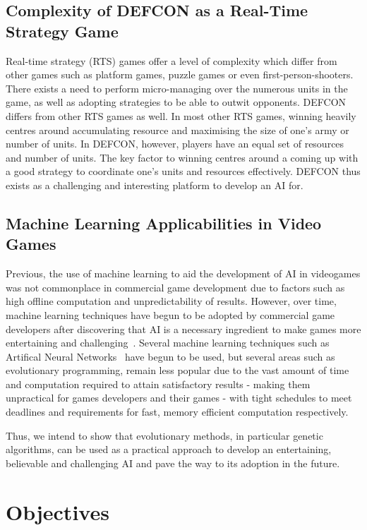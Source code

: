     \subsection{Complexity of DEFCON as a Real-Time Strategy Game}
    Real-time strategy (RTS) games offer a level of complexity which differ from other games such as platform games, puzzle games or even first-person-shooters. There exists a need to perform micro-managing over the numerous units in the game, as well as adopting strategies to be able to outwit opponents. DEFCON differs from other RTS games as well. In most other RTS games, winning heavily centres around accumulating resource and maximising the size of one's army or number of units. In DEFCON, however, players have an equal set of resources and number of units. The key factor to winning centres around a coming up with a good strategy to coordinate one's units and resources effectively. DEFCON thus exists as a challenging and interesting platform to develop an AI for.
    
    \subsection{Machine Learning Applicabilities in Video Games}
    Previous, the use of machine learning to aid the development of AI in videogames was not commonplace in commercial game development due to factors such as high offline computation and unpredictability of results. However, over time, machine learning techniques have begun to be adopted by commercial game developers after discovering that AI is a necessary ingredient to make games more entertaining and challenging~\cite{ml-and-games}. Several machine learning techniques such as Artifical Neural Networks~\cite{td-gammon} have begun to be used, but several areas such as evolutionary programming, remain less popular due to the vast amount of time and computation required to attain satisfactory results - making them unpractical for games developers and their games - with tight schedules to meet deadlines and requirements for fast, memory efficient computation respectively. 
    
    Thus, we intend to show that evolutionary methods, in particular genetic algorithms, can be used as a practical approach to develop an entertaining, believable and challenging AI and pave the way to its adoption in the future.
    
    \section{Objectives}  
    
